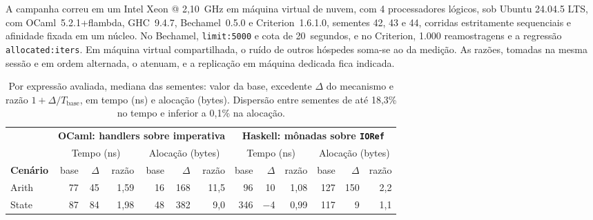 \documentclass[12pt]{article}
\newcommand{\BaseByHaskellArith}{127}
\newcommand{\BaseByHaskellState}{117}
\newcommand{\BaseByOcamlArith}{16}
\newcommand{\BaseByOcamlState}{48}
\newcommand{\BaseNsHaskellArith}{96}
\newcommand{\BaseNsHaskellState}{346}
\newcommand{\BaseNsOcamlArith}{77}
\newcommand{\BaseNsOcamlState}{87}
\newcommand{\CotaS}{20}
\newcommand{\DeltaByHaskellArith}{150}
\newcommand{\DeltaByHaskellState}{9}
\newcommand{\DeltaByOcamlArith}{168}
\newcommand{\DeltaByOcamlState}{382}
\newcommand{\DeltaNsHaskellArith}{10}
\newcommand{\DeltaNsHaskellState}{$-$4}
\newcommand{\DeltaNsOcamlArith}{45}
\newcommand{\DeltaNsOcamlState}{84}
\newcommand{\DispAlocFrase}{inferior a 0,1\%}
\newcommand{\DispTempoMax}{18,3}
\newcommand{\RAHaskellArith}{2,2}
\newcommand{\RAHaskellState}{1,1}
\newcommand{\RAOcamlArith}{11,5}
\newcommand{\RAOcamlState}{9,0}
\newcommand{\RTHaskellArith}{1,08}
\newcommand{\RTHaskellState}{0,99}
\newcommand{\RTOcamlArith}{1,59}
\newcommand{\RTOcamlState}{1,98}
\newcommand{\Reamostras}{1.000}
\newcommand{\Sementes}{42, 43 e 44}
\begin{document}
A campanha correu em um Intel Xeon @ 2,10~GHz em máquina virtual de nuvem, com 4 processadores lógicos, sob Ubuntu 24.04.5 LTS, com OCaml~5.2.1+flambda, GHC~9.4.7, Bechamel~0.5.0 e Criterion~1.6.1.0, sementes \Sementes{}, corridas estritamente sequenciais e afinidade fixada em um núcleo. No Bechamel, \texttt{limit:5000} e cota de \CotaS{}~segundos, e no Criterion, \Reamostras{} reamostragens e a regressão \texttt{allocated:iters}. Em máquina virtual compartilhada, o ruído de outros hóspedes soma-se ao da medição. As razões, tomadas na mesma sessão e em ordem alternada, o atenuam, e a replicação em máquina dedicada fica indicada.

\begin{table}[ht]
  \centering
  \caption{Por expressão avaliada, mediana das sementes: valor da base,
           excedente $\Delta$ do mecanismo e razão $1+\Delta/T_{\mathrm{base}}$,
           em tempo (ns) e alocação (bytes). Dispersão entre sementes de até
           \DispTempoMax\% no tempo e \DispAlocFrase{} na alocação.}
  \label{tab:perf-prelim}
  \footnotesize\setlength{\tabcolsep}{3.4pt}\renewcommand{\arraystretch}{1.05}
  \begin{tabular}{@{}l*{12}{r}@{}}
    \toprule
    & \multicolumn{6}{c}{\textbf{OCaml: handlers sobre imperativa}}
      & \multicolumn{6}{c}{\textbf{Haskell: mônadas sobre \texttt{IORef}}} \\
    \cmidrule(lr){2-7}\cmidrule(l){8-13}
    & \multicolumn{3}{c}{Tempo (ns)} & \multicolumn{3}{c}{Alocação (bytes)}
      & \multicolumn{3}{c}{Tempo (ns)} & \multicolumn{3}{c}{Alocação (bytes)} \\
    \cmidrule(lr){2-4}\cmidrule(lr){5-7}\cmidrule(lr){8-10}\cmidrule(l){11-13}
    \textbf{Cenário} & base & $\Delta$ & razão & base & $\Delta$ & razão
      & base & $\Delta$ & razão & base & $\Delta$ & razão \\
    \midrule
    Arith            & \BaseNsOcamlArith & \DeltaNsOcamlArith & \RTOcamlArith & \BaseByOcamlArith & \DeltaByOcamlArith & \RAOcamlArith & \BaseNsHaskellArith & \DeltaNsHaskellArith & \RTHaskellArith & \BaseByHaskellArith & \DeltaByHaskellArith & \RAHaskellArith \\
    State            & \BaseNsOcamlState & \DeltaNsOcamlState & \RTOcamlState & \BaseByOcamlState & \DeltaByOcamlState & \RAOcamlState & \BaseNsHaskellState & \DeltaNsHaskellState & \RTHaskellState & \BaseByHaskellState & \DeltaByHaskellState & \RAHaskellState \\

\end{tabular}
\end{table}
\end{document}
